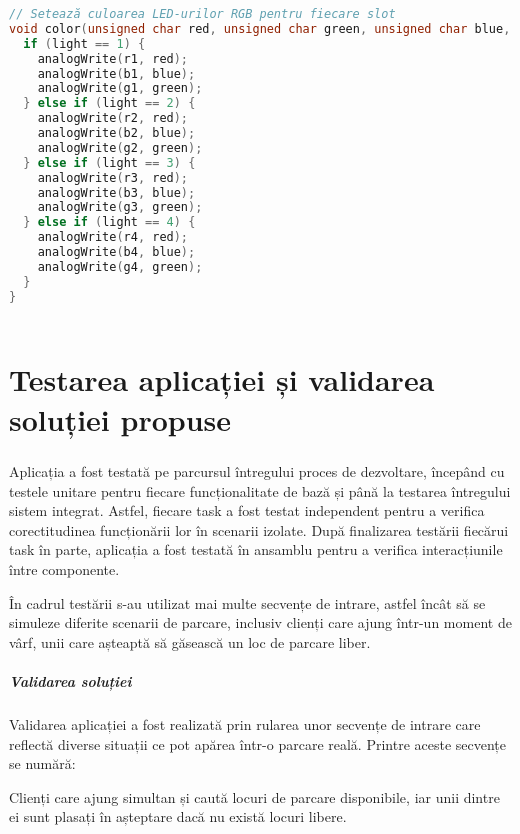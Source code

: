 \documentclass[a4paper,11pt]{report}
\begin{document}
\begin{lstlisting}[language=C]
// Setează culoarea LED-urilor RGB pentru fiecare slot
void color(unsigned char red, unsigned char green, unsigned char blue, int light) {
  if (light == 1) {
    analogWrite(r1, red);
    analogWrite(b1, blue);
    analogWrite(g1, green);
  } else if (light == 2) {
    analogWrite(r2, red);
    analogWrite(b2, blue);
    analogWrite(g2, green);
  } else if (light == 3) {
    analogWrite(r3, red);
    analogWrite(b3, blue);
    analogWrite(g3, green);
  } else if (light == 4) {
    analogWrite(r4, red);
    analogWrite(b4, blue);
    analogWrite(g4, green);
  }
}



\end{lstlisting}
\normalsize

\chapter{Testarea aplicației și validarea soluției propuse} \label{sec:testare} 


\paragraph{}

Aplicația a fost testată pe parcursul întregului proces de dezvoltare, începând cu testele unitare pentru fiecare funcționalitate de bază și până la testarea întregului sistem integrat. Astfel, fiecare task a fost testat independent pentru a verifica corectitudinea funcționării lor în scenarii izolate. După finalizarea testării fiecărui task în parte, aplicația a fost testată în ansamblu pentru a verifica interacțiunile între componente.

În cadrul testării s-au utilizat mai multe secvențe de intrare, astfel încât să se simuleze diferite scenarii de parcare, inclusiv clienți care ajung într-un moment de vârf, unii care așteaptă să găsească un loc de parcare liber.

\paragraph{Validarea soluției}

Validarea aplicației a fost realizată prin rularea unor secvențe de intrare care reflectă diverse situații ce pot apărea într-o parcare reală. Printre aceste secvențe se numără:

Clienți care ajung simultan și caută locuri de parcare disponibile, iar unii dintre ei sunt plasați în așteptare dacă nu există locuri libere.
\end{document}
